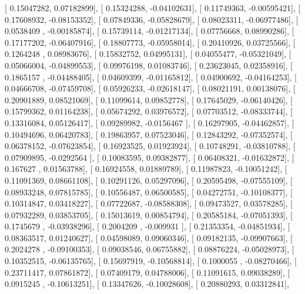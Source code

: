 \documentclass{article}
\begin{document}
       [ 0.15047282,  0.07182899],
       [ 0.15324288, -0.04102631],
       [ 0.11749363, -0.00595421],
       [ 0.17608932, -0.08153352],
       [ 0.07849336, -0.05828679],
       [ 0.08023311, -0.06977486],
       [ 0.0538409 , -0.00185874],
       [ 0.15739114, -0.01217134],
       [ 0.07756668,  0.08990286],
       [ 0.17177202, -0.06407916],
       [ 0.18807773, -0.05958014],
       [ 0.20410926,  0.03725566],
       [ 0.1264248 ,  0.08983676],
       [ 0.15832752,  0.04995131],
       [ 0.04055477, -0.05321049],
       [ 0.05066004, -0.04899553],
       [ 0.09976198,  0.01083746],
       [ 0.23623045,  0.02358916],
       [ 0.1865157 , -0.04488405],
       [ 0.04609399, -0.01165812],
       [ 0.04900692, -0.04164253],
       [ 0.04666708, -0.07459708],
       [ 0.05926233, -0.02618147],
       [ 0.08021191,  0.00138076],
       [ 0.20901889,  0.08521069],
       [ 0.11099614,  0.09852778],
       [ 0.17645029, -0.06140426],
       [ 0.15799362,  0.01164238],
       [ 0.05674292,  0.03976572],
       [ 0.07703512, -0.08333744],
       [ 0.13316084,  0.05126417],
       [ 0.09289982, -0.0156467 ],
       [ 0.16297905, -0.04462857],
       [ 0.10494696,  0.06420783],
       [ 0.19863957,  0.07523046],
       [ 0.12843292, -0.07352574],
       [ 0.06378152, -0.07623854],
       [ 0.16923525,  0.01923924],
       [ 0.10748291, -0.03810788],
       [ 0.07909895, -0.0292564 ],
       [ 0.10083595,  0.09382877],
       [ 0.06408321, -0.01632872],
       [ 0.167627  ,  0.01563788],
       [ 0.16924558,  0.01889789],
       [ 0.11987823, -0.10051242],
       [ 0.11091369,  0.08661108],
       [ 0.10291126,  0.05297096],
       [ 0.20595498, -0.07555109],
       [ 0.08933248,  0.07815785],
       [ 0.10556487,  0.06500585],
       [ 0.04272751, -0.10108377],
       [ 0.10314847,  0.03418227],
       [ 0.07722687, -0.08588308],
       [ 0.09473527,  0.03578285],
       [ 0.07932289,  0.03853705],
       [ 0.15013619,  0.00854794],
       [ 0.20585184, -0.07051393],
       [ 0.1745679 , -0.03938296],
       [ 0.2004209 , -0.009931  ],
       [ 0.21353354, -0.04851934],
       [ 0.08363517,  0.01240627],
       [ 0.04598089,  0.09060346],
       [ 0.09182135, -0.09907663],
       [ 0.2024278 , -0.09100353],
       [ 0.09038546,  0.06755882],
       [ 0.08876224, -0.05028973],
       [ 0.10352515, -0.06135765],
       [ 0.15697919, -0.10568814],
       [ 0.1000055 , -0.08270466],
       [ 0.23711417,  0.07861872],
       [ 0.07409179,  0.04788006],
       [ 0.11091615,  0.09038289],
       [ 0.0915245 , -0.10613251],
       [ 0.13347626, -0.10028608],
       [ 0.20880293,  0.03312841],
\end{document}
